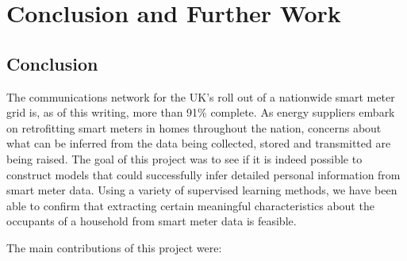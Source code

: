 \chapter{Conclusion and Further Work}

\section{Conclusion}
The communications network for the UK's roll out of a nationwide smart meter grid is, as of this writing, more than 91\% complete.  As energy suppliers embark on retrofitting smart meters in homes throughout the nation, concerns about what can be inferred from the data being collected, stored and transmitted are being raised.  The goal of this project was to see if it is indeed possible to construct models that could successfully infer detailed personal information from smart meter data.  Using a variety of supervised learning methods, we have been able to confirm that extracting certain meaningful characteristics about the occupants of a household from smart meter data is feasible. 

The main contributions of this project were:

